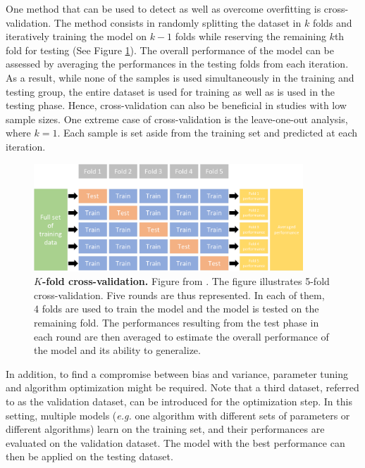 One method that can be used to detect as well as overcome overfitting is cross-validation. The method consists in randomly splitting the dataset in $k$ folds and iteratively training the model on $k-1$ folds while reserving the remaining $k$th fold for testing (See Figure \ref{fig:intro_crossvalidation}). The overall performance of the model can be assessed by averaging the performances in the testing folds from each iteration. As a result, while none of the samples is used simultaneously in the training and testing group, the entire dataset is used for training as well as is used in the testing phase. Hence, cross-validation can also be beneficial in studies with low sample sizes. One extreme case of cross-validation is the leave-one-out analysis, where $k=1$. Each sample is set aside from the training set and predicted at each iteration. 
\begin{figure}[H]
    \centering
    \includegraphics[width=0.9\textwidth]{Figures/Intro/cross_validation.pdf}
    \caption[$K$-fold cross-validation.]{\textbf{$K$-fold cross-validation.} Figure from \cite{BradleyBrandonGreenwell}. The figure illustrates 5-fold cross-validation. Five rounds are thus represented. In each of them, 4 folds are used to train the model and the model is tested on the remaining fold. The performances resulting from the test phase in each round are then averaged to estimate the overall performance of the model and its ability to generalize. }
    \label{fig:intro_crossvalidation}
\end{figure}

In addition, to find a compromise between bias and variance, parameter tuning and algorithm optimization might be required. Note that a third dataset, referred to as the validation dataset, can be introduced for the optimization step. In this setting, multiple models (\textit{e.g.} one algorithm with different sets of parameters or different algorithms) learn on the training set, and their performances are evaluated on the validation dataset. The model with the best performance can then be applied on the testing dataset.
\newline 

